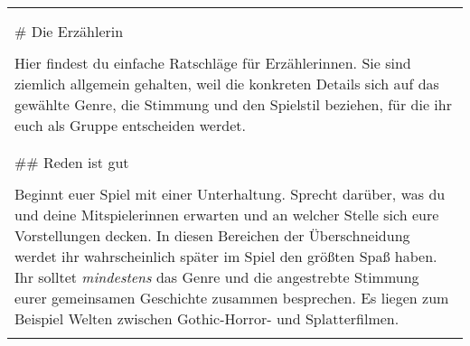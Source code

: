 \documentclass[]{article}
\begin{document}
\begin{longtable}[]{@{}l@{}}
\toprule
\begin{minipage}[t]{0.05\columnwidth}\raggedright\strut
\strut\end{minipage}\tabularnewline
\begin{minipage}[t]{0.05\columnwidth}\raggedright\strut
\strut\end{minipage}\tabularnewline
\begin{minipage}[t]{0.05\columnwidth}\raggedright\strut
\# Die Erzählerin
\strut\end{minipage}\tabularnewline
\begin{minipage}[t]{0.05\columnwidth}\raggedright\strut
\strut\end{minipage}\tabularnewline
\begin{minipage}[t]{0.05\columnwidth}\raggedright\strut
Hier findest du einfache Ratschläge für Erzählerinnen. Sie sind ziemlich
allgemein gehalten, weil die konkreten Details sich auf das gewählte
Genre, die Stimmung und den Spielstil beziehen, für die ihr euch als
Gruppe entscheiden werdet.
\strut\end{minipage}\tabularnewline
\begin{minipage}[t]{0.05\columnwidth}\raggedright\strut
\strut\end{minipage}\tabularnewline
\begin{minipage}[t]{0.05\columnwidth}\raggedright\strut
\strut\end{minipage}\tabularnewline
\begin{minipage}[t]{0.05\columnwidth}\raggedright\strut
\#\# Reden ist gut
\strut\end{minipage}\tabularnewline
\begin{minipage}[t]{0.05\columnwidth}\raggedright\strut
\strut\end{minipage}\tabularnewline
\begin{minipage}[t]{0.05\columnwidth}\raggedright\strut
Beginnt euer Spiel mit einer Unterhaltung. Sprecht darüber, was du und
deine Mitspielerinnen erwarten und an welcher Stelle sich eure
Vorstellungen decken. In diesen Bereichen der Überschneidung werdet ihr
wahrscheinlich später im Spiel den größten Spaß haben. Ihr solltet
\emph{mindestens} das Genre und die angestrebte Stimmung eurer
gemeinsamen Geschichte zusammen besprechen. Es liegen zum Beispiel
Welten zwischen Gothic-Horror- und Splatterfilmen.
\strut\end{minipage}\tabularnewline
\begin{minipage}[t]{0.05\columnwidth}\raggedright\strut

\end{minipage}
\end{longtable}
\end{document}
